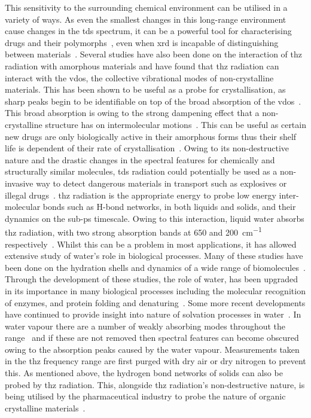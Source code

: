 This sensitivity to the surrounding chemical environment can be utilised in a variety of ways. As even the smallest changes in this long\nobreakdash-range environment cause changes in the \acrshort{tds} spectrum, it can be a powerful tool for characterising drugs and their polymorphs~\cite{Wang2022}, even when \acrfull{xrd} is incapable of distinguishing between materials~\cite{Zeitler2016, Song2021, Druzbicki2015}. Several studies have also been done on the interaction of \acrshort{thz} radiation with amorphous materials and have found that \acrshort{thz} radiation can interact with the \acrfull{vdos}, the collective vibrational modes of non-crystalline materials. This has been shown to be useful as a probe for crystallisation, as sharp peaks begin to be identifiable on top of the broad absorption of the \acrshort{vdos}~\cite{Zeitler2007}. This broad absorption is owing to the strong dampening effect that a non\nobreakdash-crystalline structure has on intermolecular motions~\cite{Walther2003}. This can be useful as certain new drugs are only biologically active in their amorphous forms thus their shelf life is dependent of their rate of crystallisation~\cite{Shmool2019}. Owing to its non\nobreakdash-destructive nature and the drastic changes in the spectral features for chemically and structurally similar molecules, \acrshort{tds} radiation could potentially be used as a non-invasive way to detect dangerous materials in transport such as explosives or illegal drugs~\cite{Davies2008}.
\acrshort{thz} radiation is the appropriate energy to probe low energy inter\nobreakdash-molecular bonds such as H\nobreakdash-bond networks, in both liquids and solids, and their dynamics on the sub\nobreakdash-ps timescale. Owing to this interaction, liquid water absorbs \acrshort{thz} radiation, with two strong absorption bands at 650 and \SI{200}{cm^{-1}} respectively~\cite{Bellissent2016}. Whilst this can be a problem in most applications, it has allowed extensive study of water’s role in biological processes. Many of these studies have been done on the hydration shells and dynamics of a wide range of biomolecules~\cite{Laman2008}. Through the development of these studies, the role of water, has been upgraded in its importance in many biological processes including the molecular recognition of enzymes, and protein folding and denaturing~\cite{gompf2004}. Some more recent developments have continued to provide insight into nature of solvation processes in water~\cite{Stephens2022}. In water vapour there are a number of weakly absorbing modes throughout the  range~\cite{Slocum2013} and if these are not removed then spectral features can become obscured owing to the absorption peaks caused by the water vapour. Measurements taken in the \acrshort{thz} frequency range are first purged with dry air or dry nitrogen to prevent this. As mentioned above, the hydrogen bond networks of solids can also be probed by \acrshort{thz} radiation. This, alongside \acrshort{thz} radiation’s non\nobreakdash-destructive nature, is being utilised by the pharmaceutical industry to probe the nature of organic crystalline materials~\cite{Zhao2018}. 
